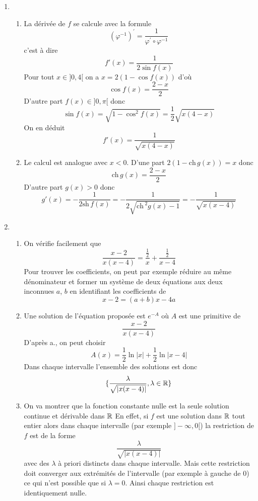 \begin{enumerate}
  \item
    \begin{enumerate}
     \item La d{\'e}riv{\'e}e de $f$ se calcule avec la formule
     \[(\varphi ^{-1})^\prime = \frac{1}{\varphi ^\prime \circ \varphi ^{-1}}\]
     c'est {\`a} dire
     \[f'(x)=\frac{1}{2\sin f(x)}\]
     Pour tout $x\in]0,4[$ on a $x=2(1-\cos f(x))$ d'o{\`u}
     \[\cos f(x)=\frac{2-x}{2}\]
     D'autre part $f(x)\in ]0,\pi[$ donc
     \[\sin f(x)= \sqrt{1-\cos ^{2} f(x)}=\frac{1}{2}\sqrt{x(4-x)}\]
     On en d{\'e}duit
     \[f'(x)=\frac{1}{\sqrt{x(4-x)}}\]

     \item Le calcul est analogue avec $x<0$. D'une
     part $2(1-\mathrm{ch\,}g(x))=x$ donc
     \[\mathrm{ch\,}g(x)=\frac{2-x}{2}\]
     D'autre part $g(x)>0$ donc
     \[g'(x)=-\frac{1}{2\mathrm{sh\,} f(x)}=-\frac{1}{2\sqrt{\mathrm{ch\,}^2g(x)-1}}=
     -\frac{1}{\sqrt{x(x-4)}}\]
    \end{enumerate}
  \item
    \begin{enumerate}
     \item On v{\'e}rifie facilement que
     \[\frac{x-2}{x(x-4)}=\frac{\frac{1}{2}}{x}+\frac{\frac{1}{2}}{x-4}\]
     Pour trouver les coefficients, on peut par exemple r{\'e}duire au m{\^e}me d{\'e}nominateur et former un syst{\`e}me de deux {\'e}quations aux
     deux inconnues $a$, $b$ en identifiant les coefficients de
     \[x-2=(a+b)x-4a\]
     \item Une solution de l'{\'e}quation propos{\'e}e est $e^{-A}$ o{\`u} $A$ est une primitive de
     \[\frac{x-2}{x(x-4)}\]
     D'apr{\`e}s a., on peut choisir
     \[A(x)=\frac{1}{2}\ln |x|+\frac{1}{2}\ln |x-4|\]
     Dans chaque intervalle l'ensemble des solutions est donc
     \[\{\frac{\lambda}{\sqrt{|x(x-4)|}} , \lambda\in\mathbb{R}\}\]
     \item On va montrer que la fonction constante nulle est la
     seule solution continue et d{\'e}rivable dans $\mathbb{R}$\newline
     En effet, si $f$ est une solution dans $\mathbb{R}$ tout entier alors dans chaque intervalle (par exemple $]-\infty , 0[$) la
     restriction de $f$ est de la forme
     \[\frac{\lambda}{\sqrt{|x(x-4)|}}\]
     avec des $\lambda$ {\`a} priori distincts dans chaque intervalle. Mais cette restriction doit converger aux extr{\'e}mit{\'e}s de
     l'intervalle (par exemple {\`a} gauche de 0) ce qui n'est possible que si $\lambda=0$. Ainsi chaque restriction est    identiquement nulle.

\end{enumerate}
\end{enumerate}
